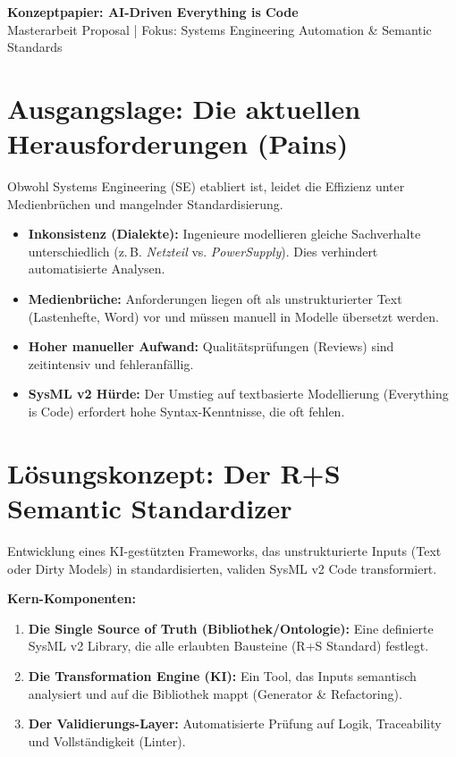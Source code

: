 \documentclass[a4paper,10pt]{article}
\begin{document}
\begin{center}
    {\Large \textbf{Konzeptpapier: AI-Driven \glqq Everything is Code\grqq{}}}\\[0.3em]
    {\small Masterarbeit Proposal | Fokus: Systems Engineering Automation \& Semantic Standards}
\end{center}

\vspace{0.3cm}

\section{Ausgangslage: Die aktuellen Herausforderungen (Pains)}
Obwohl Systems Engineering (SE) etabliert ist, leidet die Effizienz unter Medienbrüchen und mangelnder Standardisierung.
\begin{itemize}
    \item \textbf{Inkonsistenz (\glqq Dialekte\grqq):} Ingenieure modellieren gleiche Sachverhalte unterschiedlich (z.\,B. \textit{Netzteil} vs. \textit{PowerSupply}). Dies verhindert automatisierte Analysen.
    \item \textbf{Medienbrüche:} Anforderungen liegen oft als unstrukturierter Text (Lastenhefte, Word) vor und müssen manuell in Modelle übersetzt werden.
    \item \textbf{Hoher manueller Aufwand:} Qualitätsprüfungen (Reviews) sind zeitintensiv und fehleranfällig.
    \item \textbf{SysML v2 Hürde:} Der Umstieg auf textbasierte Modellierung (\glqq Everything is Code\grqq) erfordert hohe Syntax-Kenntnisse, die oft fehlen.
\end{itemize}

\section{Lösungskonzept: Der \glqq R+S Semantic Standardizer\grqq}
Entwicklung eines KI-gestützten Frameworks, das unstrukturierte Inputs (Text oder \glqq Dirty Models\grqq) in standardisierten, validen SysML v2 Code transformiert.

\textbf{Kern-Komponenten:}
\begin{enumerate}[nosep, label=\textbf{\arabic*.}]
    \item \textbf{Die \glqq Single Source of Truth\grqq{} (Bibliothek/Ontologie):} Eine definierte SysML v2 Library, die alle erlaubten Bausteine (R+S Standard) festlegt.
    \item \textbf{Die Transformation Engine (KI):} Ein Tool, das Inputs semantisch analysiert und auf die Bibliothek mappt (Generator \& Refactoring).
    \item \textbf{Der Validierungs-Layer:} Automatisierte Prüfung auf Logik, Traceability und Vollständigkeit (\glqq Linter\grqq).
\end{enumerate}
\end{document}
